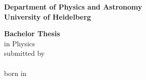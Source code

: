 \begin{titlepage}

\begin{center}
\vspace*{2cm}
\huge{\bf{Department of Physics and Astronomy}} \\
\vspace*{0.2cm}
\LARGE{\bf{University of Heidelberg}}
\end{center}
\vspace*{10cm}
\large
\begin{center}
{\bf{Bachelor Thesis}} \\
\vspace*{0.2cm}
in Physics\\
\vspace*{0.2cm}
submitted by\\
\vspace*{0.2cm}
\textbf{\thesisAuthor}\\
\vspace*{0.2cm}
born in \thesisAuthorBornIn\\
\vspace*{1cm}
\end{center}

\end{titlepage}

